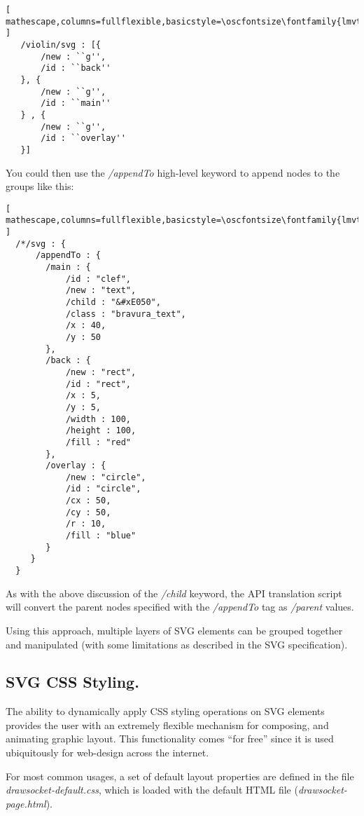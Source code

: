 \begin{lstlisting}[ mathescape,columns=fullflexible,basicstyle=\oscfontsize\fontfamily{lmvtt}\selectfont ]
   /violin/svg : [{
       /new : ``g'',
       /id : ``back''
   }, {
       /new : ``g'',
       /id : ``main''
   } , {
       /new : ``g'',
       /id : ``overlay''
   }]
\end{lstlisting}

You could then use the  \textit{/appendTo} high-level keyword to append nodes to the groups like this:

\begin{minipage}{\linewidth}
\begin{lstlisting}[ mathescape,columns=fullflexible,basicstyle=\oscfontsize\fontfamily{lmvtt}\selectfont ]
  /*/svg : {
      /appendTo : {
        /main : {
            /id : "clef",
            /new : "text",
            /child : "&#xE050",
            /class : "bravura_text",
            /x : 40,
            /y : 50
        },
        /back : {
            /new : "rect",
            /id : "rect",
            /x : 5,
            /y : 5,
            /width : 100,
            /height : 100,
            /fill : "red"
        },
        /overlay : {
            /new : "circle",
            /id : "circle",
            /cx : 50,
            /cy : 50,
            /r : 10,
            /fill : "blue"
        }
     }
  } 
\end{lstlisting}
\end{minipage}

As with the above discussion of the \textit{/child} keyword, the API translation script will convert the parent nodes specified with the \textit{/appendTo} tag as \textit{/parent} values.

Using this approach, multiple layers of SVG elements can be grouped together and manipulated (with some limitations as described in the SVG specification).

\subsection{SVG CSS Styling.} 
The ability to dynamically apply CSS styling operations on SVG elements provides the user with an extremely flexible mechanism for composing, and animating graphic layout.
This functionality comes ``for free'' since it is used ubiquitously for web-design across the internet.

For most common \drawsocket usages, a set of default layout properties are defined in the file \textit{drawsocket-default.css}, which is loaded with the default HTML file (\textit{drawsocket-page.html}).

